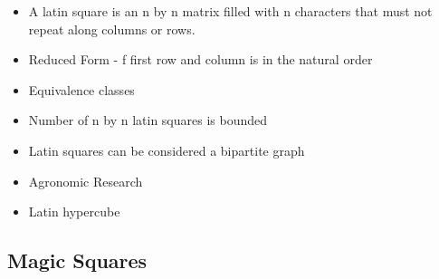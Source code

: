 \documentclass[a4paper,12pt]{article}
\begin{document}
		\begin{itemize}
		\item{A latin square is an n by n matrix filled with n characters that must not repeat along columns or rows.}
		\item{Reduced Form - f first row and column is in the natural order}
		\item{Equivalence classes}
		\item{Number of n by n latin squares is bounded}
		\item{Latin squares can be considered a bipartite graph}
		\item{Agronomic Research}
		\item{Latin hypercube}
		\end{itemize}

	\subsection{Magic Squares}
\end{document}
